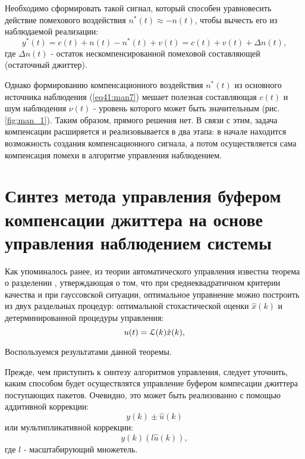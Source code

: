 Необходимо сформировать такой сигнал, который способен уравновесить действие помехового воздействия $n^*(t)\approx-n(t)$, чтобы вычесть его из наблюдаемой реализации:
\begin{equation}\label{eq41:man8}
y^*(t)=c(t)+n(t)-n^*(t)+v(t)=c(t)+v(t)+\Delta n(t),
\end{equation}
\noindent где $\Delta n(t)$ - остаток нескомпенсированной помеховой составляющей (остаточный джиттер).

Однако формированию компенсационного воздействия $n^*(t)$ из основного источника наблюдения (\ref{eq41:man7}) мешает полезная составляющая $c(t)$ и шум наблюдения $\nu (t)$ - уровень которого может быть значительным (рис. \ref{fig:man_1}).
Таким образом, прямого решения нет.
В связи с этим, задача компенсации расширяется и реализовывается в два этапа: в начале находится возможность создания компенсационного сигнала, а потом осуществляется сама компенсация помехи в алгоритме управления наблюдением.


\section{Синтез метода управления буфером компенсации джиттера на основе управления наблюдением системы}

Как упоминалось ранее, из теории автоматического управления известна теорема о разделении \cite{seij, red}, утверждающая о том, что при среднеквадратичном критерии качества и
при гауссовской ситуации, оптимальное управнение можно построить из двух раздельных процедур: оптимальной стохастической оценки $\hat x (k)$  и детерминированной процедуры управления:
\begin{equation}\label{eq41:man9}
u(t)=\EuScript{L}(k)\hat x (k),
\end{equation}

Воспользуемся результатами данной теоремы.

Прежде, чем приступить к синтезу алгоритмов управления, следует уточнить, каким способом будет осуществлятся управление буфером компесации джиттера поступающих пакетов. 
Очевидно, это может быть реализованно с помощью аддитивной коррекции:
\begin{equation}\label{eq41:man10}
y(k)\pm\hat u(k)
\end{equation}
или мультипликативной коррекции:
\begin{equation}\label{eq41:man11}
y(k)(l\hat u(k)),
\end{equation}
\noindent где $l$ - масштабирующий множетель.

